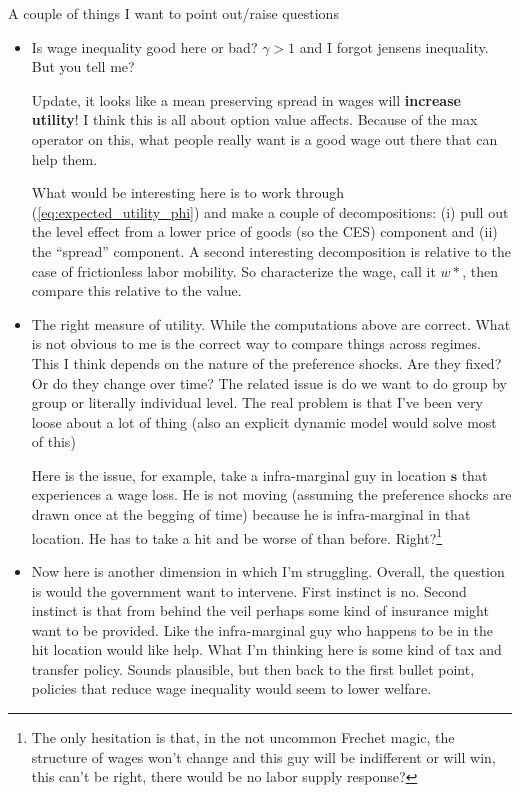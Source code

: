 \documentclass[pdftex,12pt]{article}
\begin{document}
A couple of things I want to point out/raise questions
\begin{itemize}
\item Is wage inequality good here or bad? $\gamma > 1$ and I forgot jensens inequality. But you tell me?

    Update, it looks like a mean preserving spread in wages will \textbf{increase utility}! I think this is all about option value affects. Because of the max operator on this, what people really want is a good wage out there that can help them.
    
    What would be interesting here is to work through (\ref{eq:expected_utility_phi}) and make a couple of decompositions: (i) pull out the level effect from a lower price of goods (so the CES) component and (ii) the ``spread'' component. A second interesting decomposition is relative to the case of frictionless labor mobility. So characterize the wage, call it $w*$, then compare this relative to the value. 

\item The right measure of utility. While the computations above are correct. What is not obvious to me is the correct way to compare things across regimes. This I think depends on the nature of the preference shocks. Are they fixed? Or do they change over time? The related issue is do we want to do group by group or literally individual level. The real problem is that I've been very loose about a lot of thing (also an explicit dynamic model would solve most of this)

    Here is the issue, for example, take a infra-marginal guy in location $\textbf{s}$ that experiences a wage loss. He is not moving (assuming the preference shocks are drawn once at the begging of time) because he is infra-marginal in that location. He has to take a hit and be worse of than before. Right?\footnote{The only hesitation is that, in the not uncommon Frechet magic, the structure of wages won't change and this guy will be indifferent or will win, this can't be right, there would be no labor supply response?}

\item Now here is another dimension in which I'm struggling. Overall, the question is would the government want to intervene. First instinct is no. Second instinct is that from behind the veil perhaps some kind of insurance might want to be provided. Like the infra-marginal guy who happens to be in the hit location would like help. What I'm thinking here is some kind of tax and transfer policy. Sounds plausible, but then back to the first bullet point, policies that reduce wage inequality would seem to lower welfare.

\end{itemize}
\end{document}
